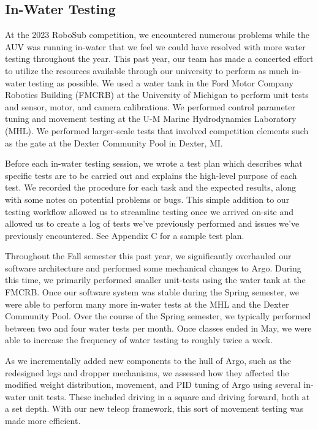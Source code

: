 \documentclass[conference]{IEEEtran}
\begin{document}
\subsection{In-Water Testing}
\label{ssec:in_water_testing}

At the 2023 RoboSub competition, we encountered numerous problems while the AUV was running in-water that we feel we could have resolved with more water testing throughout the year. This past year, our team has made a concerted effort to utilize the resources available through our university to perform as much in-water testing as possible. We used a water tank in the Ford Motor Company Robotics Building (FMCRB) at the University of Michigan to perform unit tests and sensor, motor, and camera calibrations. We performed control parameter tuning and movement testing at the U-M Marine Hydrodynamics Laboratory (MHL). We performed larger-scale tests that involved competition elements such as the gate at the Dexter Community Pool in Dexter, MI.

Before each in-water testing session, we wrote a test plan which describes what specific tests are to be carried out and explains the high-level purpose of each test. We recorded the procedure for each task and the expected results, along with some notes on potential problems or bugs. This simple addition to our testing workflow allowed us to streamline testing once we arrived on-site and allowed us to create a log of tests we’ve previously performed and issues we’ve previously encountered. See Appendix C for a sample test plan. 

Throughout the Fall semester this past year, we significantly overhauled our software architecture and performed some mechanical changes to Argo. During this time, we primarily performed smaller unit-tests using the water tank at the FMCRB. Once our software system was stable during the Spring semester, we were able to perform many more in-water tests at the MHL and the Dexter Community Pool. Over the course of the Spring semester, we typically performed between two and four water tests per month. Once classes ended in May, we were able to increase the frequency of water testing to roughly twice a week.

As we incrementally added new components to the hull of Argo, such as the redesigned legs and dropper mechanisms, we assessed how they affected the modified weight distribution, movement, and PID tuning of Argo using several in-water unit tests. These included driving in a square and driving forward, both at a set depth. With our new teleop framework, this sort of movement testing was made more efficient.
\end{document}
